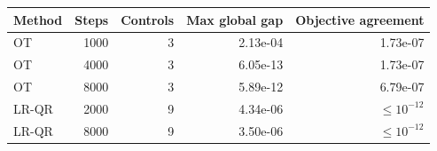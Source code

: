 \begin{tabular}{lrrrr}
\toprule
Method & Steps & Controls & Max global gap & Objective agreement \\
\midrule
OT & 1000 & 3 & 2.13e-04 & 1.73e-07 \\
OT & 4000 & 3 & 6.05e-13 & 1.73e-07 \\
OT & 8000 & 3 & 5.89e-12 & 6.79e-07 \\
LR-QR & 2000 & 9 & 4.34e-06 & $\le 10^{-12}$ \\
LR-QR & 8000 & 9 & 3.50e-06 & $\le 10^{-12}$ \\
\bottomrule
\end{tabular}
